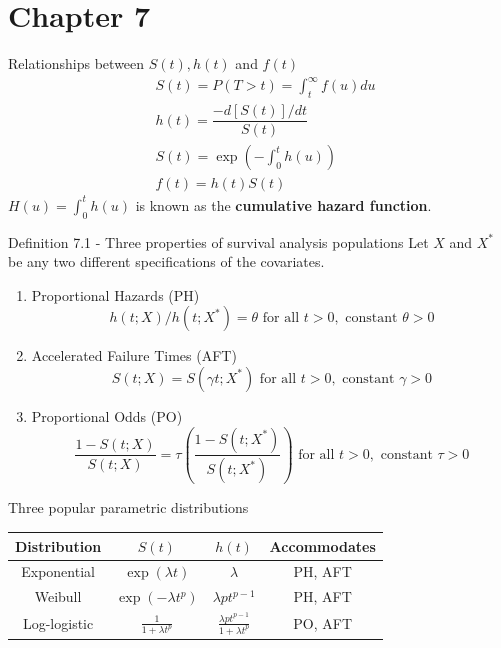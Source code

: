 \documentclass{beamer}
\theoremstyle{definition}
\begin{document}
\section{Chapter 7}
\begin{frame}
\begin{block}{Relationships between $S(t), h(t)$ and $f(t)$}
\begin{align*}
& S(t) = P(T>t) = \int_t^\infty f(u) du  \\
& h(t) = \dfrac{-d[S(t)]/dt}{S(t)} \\
& S(t) = \exp\left(-\int_0^t h(u)\right) \\
& f(t) = h(t) S(t)
\end{align*}
$H(u)=\int_0^t h(u)$ is known as the \textbf{cumulative hazard function}.
\end{block}
\end{frame}
\begin{frame}
\begin{block}{Definition 7.1 - Three properties of survival analysis populations}
Let $X$ and $X^*$ be any two different specifications of the covariates.
\begin{enumerate}
\item Proportional Hazards (PH)
\[ h(t;X)/h(t;X^*) = \theta \text{ for all } t>0, \text{ constant } \theta > 0 \]
\item Accelerated Failure Times (AFT)
\[ S(t;X) =  S(\gamma t;X^*)  \text{ for all } t>0, \text{ constant } \gamma > 0
\]
\item Proportional Odds (PO)
\[ \frac{1- S(t;X)}{S(t;X)} = \tau \left(\frac{1- S(t;X^*)}{S(t;X^*)}\right)  \text{ for all } t>0, \text{ constant } \tau > 0
\]
\end{enumerate}
\end{block}
\end{frame}

\begin{frame}
\begin{block}{Three popular parametric distributions}
\begin{center}
\begin{tabular}{ c c c | c }
Distribution & $S(t)$ & $h(t)$ & Accommodates \\ \hline
Exponential & $\exp(\lambda t)$ & $\lambda$ & PH, AFT \\
Weibull  & $\exp(-\lambda t^p)$ & $\lambda p t^{p-1}$ & PH, AFT\\
Log-logistic & $\frac{1}{1+\lambda t^p}$ & $ \frac{\lambda p t^{p-1}}{1+\lambda t^p}$ & PO, AFT
\end{tabular}
\end{center}
\end{block}
\end{frame}
\end{document}
